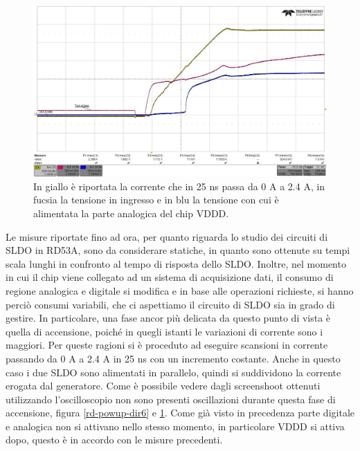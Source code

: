 \begin{figure}
\centering
\includegraphics[scale=.3]{Immagini/rd-powup-dir7}
\caption{In giallo è riportata la corrente che in 25 ns passa da 0 A a 2.4 A, in fucsia la tensione in ingresso e in blu la tensione con cui è alimentata la parte analogica del chip VDDD.}
\label{rd-powup-dir7}
\end{figure}
Le misure riportate fino ad ora, per quanto riguarda lo studio dei circuiti di SLDO in RD53A, sono da considerare statiche, in quanto sono ottenute su tempi scala lunghi in confronto al tempo di risposta dello SLDO. 
Inoltre, nel momento in cui il chip viene collegato ad un sistema di acquisizione dati, il consumo di regione analogica e digitale si modifica e in base alle operazioni richieste, si hanno perciò consumi variabili, che ci aspettiamo il circuito di SLDO sia in grado di gestire. 
In particolare, una fase ancor più delicata da questo punto di vista è quella di accensione, poiché in quegli istanti le variazioni di corrente sono i maggiori. 
Per queste ragioni si è proceduto ad eseguire scansioni in corrente passando da 0 A a 2.4 A in 25 ns con un incremento costante. 
Anche in questo caso i due SLDO sono alimentati in parallelo, quindi si suddividono la corrente erogata dal generatore. 
Come è possibile vedere dagli screenshoot ottenuti utilizzando l'oscilloscopio non sono presenti oscillazioni durante questa fase di accensione, figura \ref{rd-powup-dir6} e \ref{rd-powup-dir7}. 
Come già visto in precedenza parte digitale e analogica non si attivano nello stesso momento, in particolare VDDD si attiva dopo, questo è in accordo con le misure precedenti.


